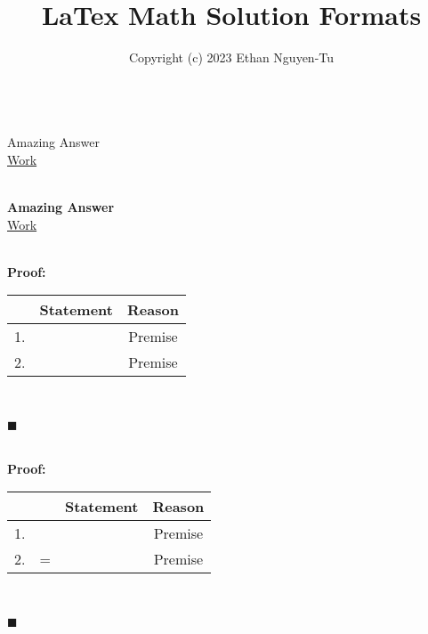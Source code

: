 \documentclass[11pt]{article}
\title{\vspace{-2cm}LaTex Math Solution Formats}
\author{Copyright (c) 2023 Ethan Nguyen-Tu}
\date{}
\begin{document}
    \maketitle


    \begin{solution}
    
    \end{solution}

    \begin{solution}\\
        Amazing Answer
        \\\underline{Work}\\
    \end{solution}

    \begin{solution}\\
        \textbf{Amazing Answer}
        \\\underline{Work}\\
    \end{solution}

    \begin{solution}\\
        \textbf{Proof:}\\
        \begin{center}
        \begin{tabular}{rc|c}
        & Statement & Reason \\
        \hline
        1. & & Premise\\
        2. & & Premise
        \end{tabular}\\
        \end{center}
        
        $\blacksquare$
    \end{solution}

    \begin{solution}\\
        \textbf{Proof:}\\
        \begin{center}
        \begin{tabular}{rcc|c}
        && Statement & Reason \\
        \hline
        1. && & Premise\\
        2. &=& & Premise
        \end{tabular}\\
        \end{center}
        
        $\blacksquare$
    \end{solution}
\end{document}
